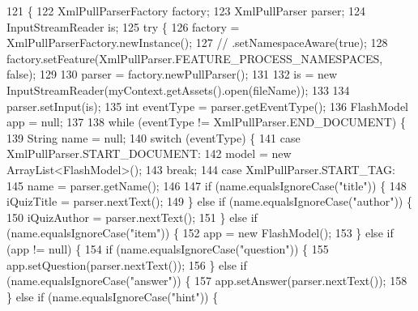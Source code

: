 \begin{DoxyCode}
121                                                                    \{
122         XmlPullParserFactory factory;
123         XmlPullParser parser;
124         InputStreamReader is;
125         \textcolor{keywordflow}{try} \{
126             factory = XmlPullParserFactory.newInstance();
127             \textcolor{comment}{// .setNamespaceAware(true);}
128             factory.setFeature(XmlPullParser.FEATURE\_PROCESS\_NAMESPACES, \textcolor{keyword}{false});
129 
130             parser = factory.newPullParser();
131 
132             is = \textcolor{keyword}{new} InputStreamReader(myContext.getAssets().open(fileName));
133 
134             parser.setInput(is);
135             \textcolor{keywordtype}{int} eventType = parser.getEventType();
136             FlashModel app = null;
137 
138             \textcolor{keywordflow}{while} (eventType != XmlPullParser.END\_DOCUMENT) \{
139                 String name = null;
140                 \textcolor{keywordflow}{switch} (eventType) \{
141                     \textcolor{keywordflow}{case} XmlPullParser.START\_DOCUMENT:
142                         model = \textcolor{keyword}{new} ArrayList<FlashModel>();
143                         \textcolor{keywordflow}{break};
144                     \textcolor{keywordflow}{case} XmlPullParser.START\_TAG:
145                         name = parser.getName();
146 
147                         \textcolor{keywordflow}{if} (name.equalsIgnoreCase(\textcolor{stringliteral}{"title"})) \{
148                             iQuizTitle = parser.nextText();
149                         \} \textcolor{keywordflow}{else} \textcolor{keywordflow}{if} (name.equalsIgnoreCase(\textcolor{stringliteral}{"author"})) \{
150                             iQuizAuthor = parser.nextText();
151                         \} \textcolor{keywordflow}{else} \textcolor{keywordflow}{if} (name.equalsIgnoreCase(\textcolor{stringliteral}{"item"})) \{
152                             app = \textcolor{keyword}{new} FlashModel();
153                         \} \textcolor{keywordflow}{else} \textcolor{keywordflow}{if} (app != null) \{
154                             \textcolor{keywordflow}{if} (name.equalsIgnoreCase(\textcolor{stringliteral}{"question"})) \{
155                                 app.setQuestion(parser.nextText());
156                             \} \textcolor{keywordflow}{else} \textcolor{keywordflow}{if} (name.equalsIgnoreCase(\textcolor{stringliteral}{"answer"})) \{
157                                 app.setAnswer(parser.nextText());
158                             \} \textcolor{keywordflow}{else} \textcolor{keywordflow}{if} (name.equalsIgnoreCase(\textcolor{stringliteral}{"hint"})) \{

\end{DoxyCode}
